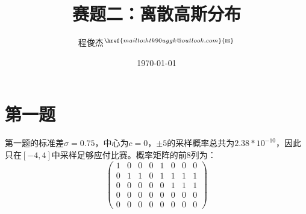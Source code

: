 \documentclass{article}
\title{赛题二：离散高斯分布}
\author{程俊杰$^{\href{mailto:htk90uggk@outlook.com}{\textrm{\Letter}}}$}
\date{\today}
\begin{document}
	\maketitle
	\section{第一题}
	第一题的标准差$\sigma = 0.75$，中心为$c = 0$，$\pm5$的采样概率总共为$2.38 * 10^{-10}$，因此只在$[-4, 4]$中采样足够应付比赛。概率矩阵的前8列为：
	\begin{equation}
		\begin{pmatrix}
			1 & 0 & 0 & 0 & 1 & 0 & 0 & 0 \\
			0 & 1 & 1 & 0 & 1 & 1 & 1 & 1 \\
			0 & 0 & 0 & 0 & 0 & 1 & 1 & 1 \\
			0 & 0 & 0 & 0 & 0 & 0 & 0 & 0 \\
			0 & 0 & 0 & 0 & 0 & 0 & 0 & 0
		\end{pmatrix}
	\end{equation}
	
\end{document}

